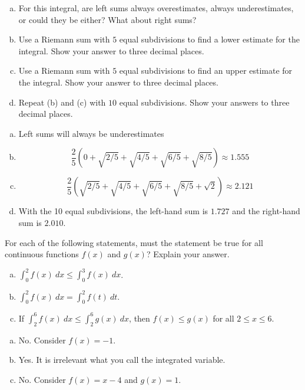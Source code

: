 \documentclass[11pt]{exam}
\begin{document}
\begin{questions}
\begin{enumerate}[(a)]
	\item For this integral, are left sums always overestimates, always underestimates, or could they be either? What about right sums?
	\item Use a Riemann sum with $5$ equal subdivisions to find a lower estimate for the integral. Show your answer to three decimal places.
	\item Use a Riemann sum with $5$ equal subdivisions to find an upper estimate for the integral. Show your answer to three decimal places.
	\item Repeat (b) and (c) with $10$ equal subdivisions. Show your answers to three decimal places.
\end{enumerate}
\begin{solution}
  \begin{enumerate}[(a)]
  \item Left sums will always be underestimates
  \item \[
      \frac{2}{5}\left( 0+\sqrt{2/5}+\sqrt{4/5}+\sqrt{6/5}+\sqrt{8/5}
      \right) \approx 1.555
    \]
  \item \[
      \frac{2}{5}\left( \sqrt{2/5}+\sqrt{4/5}+\sqrt{6/5}+\sqrt{8/5} +
        \sqrt{2} \right) \approx 2.121
    \]
  \item With the 10 equal subdivisions, the left-hand sum is \(1.727\)
    and the right-hand sum is \(2.010\). 
  \end{enumerate}
\end{solution}
\question For each of the following statements, must the statement be true for all continuous functions $f(x)$ and $g(x)$? Explain your answer.
\begin{enumerate}[(a)]
	\item $\displaystyle\int_0^2 f(x) \: dx \leqslant \displaystyle\int_0^3 f(x)\: dx$.
	\item $\displaystyle\int_0^2 f(x) \: dx = \displaystyle\int_0^2 f(t)\: dt$.
	\item If $\displaystyle\int_2^6 f(x) \: dx \leqslant \int_2^6 g(x)\: dx$, then $f(x) \leqslant g(x)$ for all $2 \leqslant x \leqslant 6$.	
\end{enumerate}
\begin{solution}
  \begin{enumerate}[(a)]
  \item No. Consider \(f(x) = -1\). 
  \item Yes. It is irrelevant what you call the integrated variable.
  \item No. Consider \(f(x) = x-4\) and \(g(x) = 1\). 

\end{enumerate}
\end{solution}
\end{questions}
\end{document}
